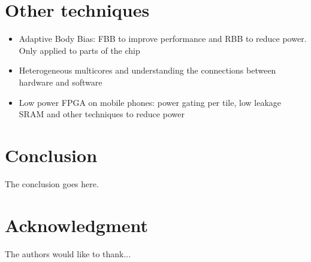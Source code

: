 \documentclass[journal]{IEEEtran}
\begin{document}
\section{Other techniques}
\begin{itemize}
	\item Adaptive Body Bias: FBB to improve performance and RBB to reduce power. Only applied to parts of the chip \cite{ABB}
	\item Heterogeneous multicores and understanding the connections between hardware and software \cite{HD/SF} \cite{MultiCores}
	\item Low power FPGA on mobile phones: power gating per tile, low leakage SRAM and other techniques to reduce power \cite{FPGA}
\end{itemize}

\section{Conclusion}
The conclusion goes here.

\appendices

\section*{Acknowledgment}
The authors would like to thank...


\ifCLASSOPTIONcaptionsoff
  \newpage
\fi




\end{document}
